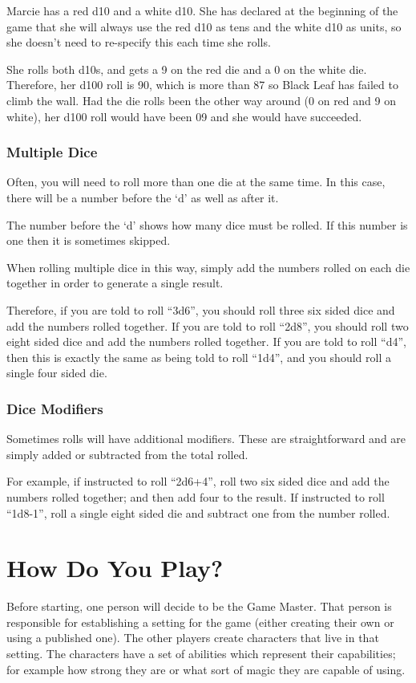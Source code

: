 \begin{multicols*}{2}
{Marcie has a red d10 and a white d10. She has declared at the beginning of the game that she will always use the red d10 as tens and the white d10 as units, so she doesn’t need to re-specify this each time she rolls.

She rolls both d10s, and gets a 9 on the red die and a 0 on the white die. Therefore, her d100 roll is 90, which is more than 87 so Black Leaf has failed to climb the wall. Had the die rolls been the other way around (0 on red and 9 on white), her d100 roll would have been 09 and she would have succeeded.}

\subsubsection{Multiple Dice}
Often, you will need to roll more than one die at the same time. In this case, there will be a number before the ‘d’ as well as after it.

The number before the ‘d’ shows how many dice must be rolled. If this number is one then it is sometimes skipped.

When rolling multiple dice in this way, simply add the numbers rolled on each die together in order to generate a single result.

Therefore, if you are told to roll “3d6”, you should roll three six sided dice and add the numbers rolled together. If you are told to roll “2d8”, you should roll two eight sided dice and add the numbers rolled together. If you are told to roll “d4”, then this is exactly the same as being told to roll “1d4”, and you should roll a single four sided die.

\subsubsection{Dice Modifiers}
Sometimes rolls will have additional modifiers. These are straightforward and are simply added or subtracted from the total rolled.

For example, if instructed to roll “2d6+4”, roll two six sided dice and add the numbers rolled together; and then add four to the result. If instructed to roll “1d8-1”, roll a single eight sided die and subtract one from the number rolled.

\section{How Do You Play?}
Before starting, one person will decide to be the Game Master. That person is responsible for establishing a setting for the game (either creating their own or using a published one). The other players create characters that live in that setting. The characters have a set of abilities which represent their capabilities; for example how strong they are or what sort of magic they are capable of using.


\end{multicols*}
